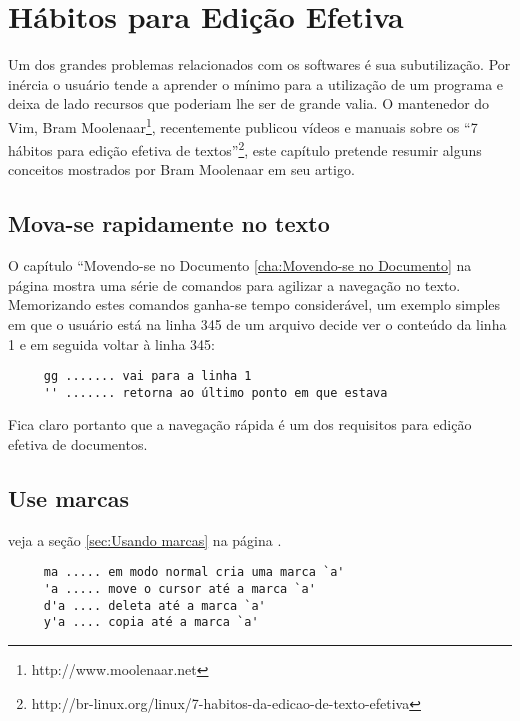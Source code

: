 
\chapter{Hábitos para Edição Efetiva}
\label{cha:Hábitos para edição efetiva}


Um dos grandes problemas relacionados com os softwares é sua subutilização. Por
inércia o usuário tende a aprender o mínimo para a utilização de um programa e
deixa de lado recursos que poderiam lhe ser de grande valia. O mantenedor do
Vim, Bram Moolenaar\footnote{http://www.moolenaar.net}, recentemente publicou
vídeos e manuais sobre os ``7 hábitos para edição efetiva de
textos''\footnote{http://br-linux.org/linux/7-habitos-da-edicao-de-texto-efetiva},
este capítulo pretende resumir alguns conceitos mostrados por Bram Moolenaar em
seu artigo.

\section{Mova-se rapidamente no texto}
\label{sec:Mova-se rapidamente no texto}

O capítulo ``Movendo-se no Documento \ref{cha:Movendo-se no Documento} na
página \pageref{cha:Movendo-se no Documento} mostra uma série de comandos para
agilizar a navegação no texto. Memorizando estes comandos ganha-se tempo
considerável, um exemplo simples em que o usuário está na linha 345 de um arquivo
decide ver o conteúdo da linha 1 e em seguida voltar à linha 345:

\begin{verbatim}
     gg ....... vai para a linha 1
     '' ....... retorna ao último ponto em que estava
\end{verbatim}

Fica claro portanto que a navegação rápida é um dos requisitos para edição
efetiva de documentos.


\section{Use marcas}
veja a seção \ref{sec:Usando marcas} na página \pageref{sec:Usando marcas}.

\begin{verbatim}
     ma ..... em modo normal cria uma marca `a'
     'a ..... move o cursor até a marca `a'
     d'a .... deleta até a marca `a'
     y'a .... copia até a marca `a'
\end{verbatim}



